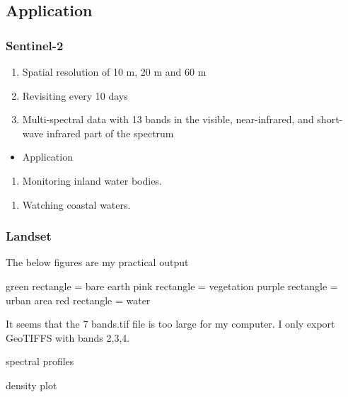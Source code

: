 \documentclass[
  letterpaper,
  DIV=11,
  numbers=noendperiod]{scrreprt}
\providecommand{\tightlist}{%
  \setlength{\itemsep}{0pt}\setlength{\parskip}{0pt}}\usepackage{longtable,booktabs,array}
\begin{document}
\hypertarget{application}{%
\subsection{Application}\label{application}}

\hypertarget{sentinel-2}{%
\subsubsection{Sentinel-2}\label{sentinel-2}}

\begin{enumerate}
\def\labelenumi{\arabic{enumi}.}
\tightlist
\item
  Spatial resolution of 10 m, 20 m and 60 m
\item
  Revisiting every 10 days
\item
  Multi-spectral data with 13 bands in the visible, near-infrared, and
  short-wave infrared part of the spectrum
\end{enumerate}

\begin{itemize}
\tightlist
\item
  Application
\end{itemize}

\begin{enumerate}
\def\labelenumi{\arabic{enumi}.}
\tightlist
\item
  Monitoring inland water bodies.
\end{enumerate}

\begin{enumerate}
\def\labelenumi{\arabic{enumi}.}
\setcounter{enumi}{1}
\tightlist
\item
  Watching coastal waters.
\end{enumerate}

\hypertarget{landset}{%
\subsubsection{Landset}\label{landset}}

The below figures are my practical output

green rectangle = bare earth pink rectangle = vegetation purple
rectangle = urban area red rectangle = water

It seems that the 7 bands.tif file is too large for my computer. I only
export GeoTIFFS with bands 2,3,4.

spectral profiles

density plot
\end{document}
